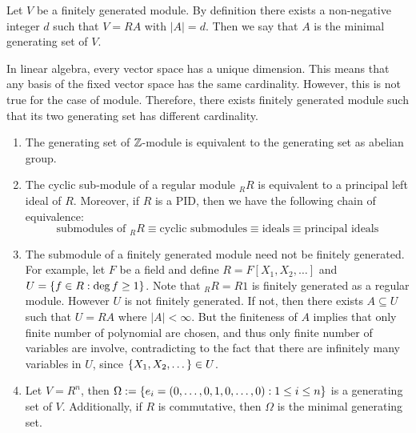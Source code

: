 \medskip

\begin{defn}
    Let $V$ be a finitely generated module. By definition there exists a non-negative integer $d$ such that $V=RA$ with $|A|=d$. Then we say that $A$ is the minimal generating set of $V$.
\end{defn}

\medskip

\begin{re}
    In linear algebra, every vector space has a unique dimension. This means that any basis of the fixed vector space has the same cardinality. However, this is not true for the case of module. Therefore, there exists finitely generated module such that its two generating set has different cardinality.
\end{re}

\medskip

\begin{ex}
    \hfill
    \begin{enumerate}
        \item The generating set of ${\mathbb Z}$-module is equivalent to the generating set as abelian group.
        \item The cyclic sub-module of a regular module $_RR$ is equivalent to a principal left ideal of $R$. Moreover, if $R$ is a PID, then we have the following chain of equivalence:
        \[\text{submodules of $_RR$} \equiv \text{cyclic submodules} \equiv \text{ideals} \equiv \text{principal ideals}\]
        \item The submodule of a finitely generated module need not be finitely generated. For example, let $F$ be a field and define $R=F[X_1,X_2,\dots]$ and $U=\left\{f\in R:\deg f\ge 1\right\}$. Note that $_RR=R1$ is finitely generated as a regular module. However $U$ is not finitely generated. If not, then there exists $A\subseteq U$ such that $U=RA$ where $|A|<\infty$. But the finiteness of $A$ implies that only finite number of polynomial are chosen, and thus only finite number of variables are involve, contradicting to the fact that there are infinitely many variables in $U$, since $\left\{X_1,X_2, \dots\right\}\in U$.
        \item Let $V=R^n$, then $\Omega:= \left\{e_i=\left(0,\dots,0,1,0,\dots,0\right):1\leq i\leq n\right\}$ is a generating set of $V$. Additionally, if $R$ is commutative, then $\Omega$ is the minimal generating set.
    \end{enumerate}
\end{ex}

